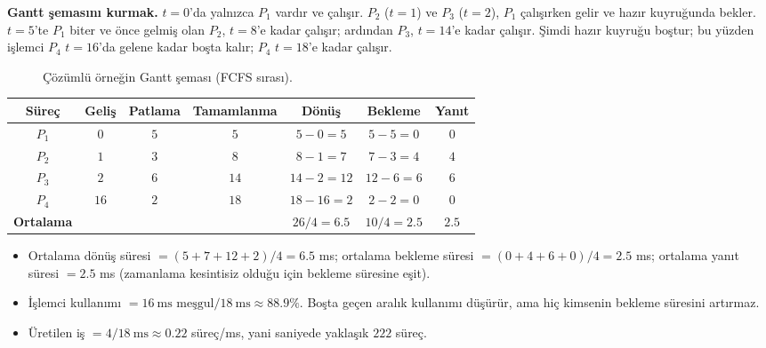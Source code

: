 \documentclass[11pt,a4paper]{article}
\begin{document}
\textbf{Gantt şemasını kurmak.} $t=0$'da yalnızca $P_1$ vardır ve çalışır. $P_2$ ($t=1$) ve $P_3$ ($t=2$), $P_1$ çalışırken gelir ve hazır kuyruğunda bekler. $t=5$'te $P_1$ biter ve önce gelmiş olan $P_2$, $t=8$'e kadar çalışır; ardından $P_3$, $t=14$'e kadar çalışır. Şimdi hazır kuyruğu boştur; bu yüzden işlemci $P_4$ $t=16$'da gelene kadar boşta kalır; $P_4$ $t=18$'e kadar çalışır.

\begin{figure}[H]
\centering
{}
\caption{Çözümlü örneğin Gantt şeması (FCFS sırası).}
\end{figure}

\begin{center}
\renewcommand{\arraystretch}{1.3}
\begin{tabular}{@{}ccccccc@{}}
\toprule
\textbf{Süreç} & \textbf{Geliş} & \textbf{Patlama} & \textbf{Tamamlanma} & \textbf{Dönüş} & \textbf{Bekleme} & \textbf{Yanıt} \\
\midrule
$P_1$ & $0$ & $5$ & $5$ & $5-0=5$ & $5-5=0$ & $0$ \\
$P_2$ & $1$ & $3$ & $8$ & $8-1=7$ & $7-3=4$ & $4$ \\
$P_3$ & $2$ & $6$ & $14$ & $14-2=12$ & $12-6=6$ & $6$ \\
$P_4$ & $16$ & $2$ & $18$ & $18-16=2$ & $2-2=0$ & $0$ \\
\midrule
\textbf{Ortalama} & & & & $26/4 = 6.5$ & $10/4 = 2.5$ & $2.5$ \\
\bottomrule
\end{tabular}
\end{center}

\begin{itemize}
  \item Ortalama dönüş süresi $= (5+7+12+2)/4 = 6.5$ ms; ortalama bekleme süresi $= (0+4+6+0)/4 = 2.5$ ms; ortalama yanıt süresi $= 2.5$ ms (zamanlama kesintisiz olduğu için bekleme süresine eşit).
  \item İşlemci kullanımı $= 16\ \text{ms meşgul} / 18\ \text{ms} \approx 88.9\%$. Boşta geçen aralık kullanımı düşürür, ama hiç kimsenin bekleme süresini artırmaz.
  \item Üretilen iş $= 4 / 18\ \text{ms} \approx 0.22$ süreç/ms, yani saniyede yaklaşık $222$ süreç.
\end{itemize}
\end{document}
